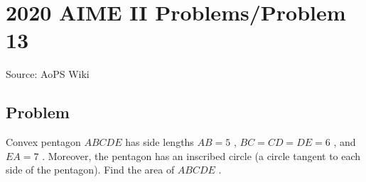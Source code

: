 \documentclass[12pt]{article}
\begin{document}
\section*{{2020 AIME II Problems/Problem 13}}
Source: AoPS Wiki

\subsection*{Problem}
Convex pentagon $ABCDE$ has side lengths $AB=5$ , $BC=CD=DE=6$ , and $EA=7$ . Moreover, the pentagon has an inscribed circle (a circle tangent to each side of the pentagon). Find the area of $ABCDE$ .
\end{document}

